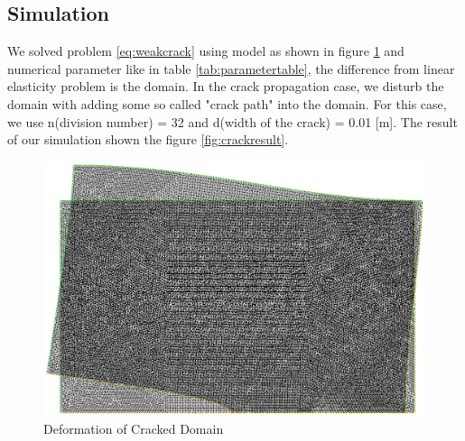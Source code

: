 \documentclass[a4paper,11pt]{article}
\begin{document}
\subsection{Simulation}
We solved problem \eqref{eq:weakcrack} using model as shown in figure \ref{fig:mesh-deform-crack} and numerical parameter like in table \ref{tab:parametertable}, the difference from linear elasticity problem is the domain. In the crack propagation case, we disturb the domain with adding some so called "crack path" into the domain. For this case, we use n(division number) = 32 and d(width of the crack) = 0.01 [m]. The result of our simulation shown the figure \ref{fig:crackresult}.
\begin{figure}[h!]
	\centering
	\includegraphics[width=0.6\linewidth]{picture/conference/mesh-deform-crack}
	\caption{Deformation of Cracked Domain}
	\label{fig:mesh-deform-crack}
\end{figure}
\end{document}
